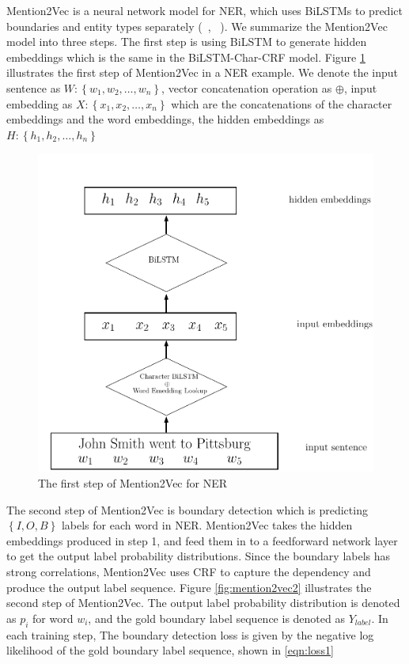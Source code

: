 \documentclass{sfuthesis}
\begin{document}
Mention2Vec is a neural network model for NER, which uses BiLSTMs to predict boundaries and entity types separately (~\citeauthor{stratos2016mention2vec}, ~\citeyear{stratos2016mention2vec}). We summarize the Mention2Vec model into three steps. The first step is using BiLSTM to generate hidden embeddings which is the same in the BiLSTM-Char-CRF model. Figure \ref{fig:mention2vec1} illustrates the first step of Mention2Vec in a NER example. We denote the input sentence as $W: \left\{w_{1}, w_{2}, \dots, w_{n}\right\}$, vector concatenation operation as $\oplus$, input embedding as $X: \left\{x_{1}, x_{2}, \dots, x_{n}\right\}$ which are the concatenations of the character embeddings and the word embeddings, the hidden embeddings as $H: \left\{h_{1}, h_{2}, \dots, h_{n}\right\}$

\begin{figure}
  \centering
  \includegraphics[scale=0.6]{mention2vec1.pdf}
 \caption{The first step of Mention2Vec for NER}
  \label{fig:mention2vec1}
\end{figure}


The second step of Mention2Vec is boundary detection which is predicting $\left\{I, O, B\right\}$ labels for each word in NER. Mention2Vec takes the hidden embeddings produced in step 1, and feed them in to a feedforward network layer to get the output label probability distributions. Since the boundary labels has strong correlations, Mention2Vec uses CRF to capture the dependency and produce the output label sequence. Figure \ref{fig:mention2vec2} illustrates the second step of Mention2Vec. The output label probability distribution is denoted as $p_{i}$ for word $w_{i}$, and the gold boundary label sequence is denoted as $Y_{label}$. In each training step, The boundary detection loss is given by the negative log likelihood of the gold boundary label sequence, shown in \ref{eqn:loss1}
\end{document}
